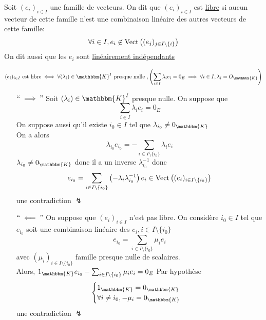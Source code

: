 \begin{defn}
	Soit $(e_i)_{i\in I}$ une famille de vecteurs. On dit que $(e_i)_{i\in I}$ est \underline{libre} si aucun vecteur de cette famille n'est une combinaison linéaire des autres vecteurs de cette famille: \[
		\forall i \in I, e_{i} \not\in \operatorname{Vect}\left( (e_j)_{j\in I \setminus \{i\}} \right) 
	\] On dit aussi que les  $e_i$ sont \underline{linéairement indépendants}
\end{defn}

\begin{prop}
	\[
		(e_i)_{i\in I} \text{ est libre} \iff
		\forall (\lambda_i) \in \mathbbm{K}^I \text{ presque nulle },
		\left( \sum_{i \in I} \lambda_i e_i = 0_E \implies \forall i \in I, \lambda_i = O_\mathbbm{K} \right) 
	\] 
\end{prop}

\begin{prv}
	\begin{itemize}
		\item[$``\implies"$] Soit $(\lambda_i) \in \mathbbm{K}^I$ presque nulle. On suppose que \[
				\sum_{i \in I} \lambda_i e_i = 0_E
			\] On suppose aussi qu'il existe $i_0 \in I$ tel que $\lambda_{i_0} \neq 0_\mathbbm{K}$\\
			On a alors \[
				\lambda_{i_0}e_{i_0} = -\sum_{i \in I \setminus \{i_0\}} \lambda_i e_i
			\]
			$\lambda_{i_0} \neq 0_\mathbbm{K}$ donc il a un inverse $\lambda^{-1}_{i_0}$ donc \[
				e_{i_0} = \sum_{i \in I\setminus \{i_0\}} \left(-\lambda_i\lambda^{-1}_{i_0}\right)
				e_i \in \operatorname{Vect}\left( (e_i)_{i\in I\setminus \{i_0\} } \right) 
			\] une contradiction $\lightning$
		\item[$``\impliedby"$] On suppose que $(e_i)_{i\in I}$ n'est pas libre. On considère $i_0 \in I$ tel que $e_{i_0}$ soit une combinaison linéaire des $e_i, i \in I \setminus \{i_0\}$
			\[
				e_{i_0} = \sum_{i \in I\setminus \{i_0\}} \mu_i e_i
			\] avec $(\mu_i)_{i\in I \setminus \{i_0\}}$ famille presque nulle de scalaires.\\
			Alors, $1_{\mathbbm{K}}e_{i_0} - \sum_{i \in I\setminus \{i_0\}} \mu_ie_i = 0_E$
			Par hypothèse \[
				\begin{cases}
					1_\mathbbm{K} = 0_\mathbbm{K}\\
					\forall i \neq i_0, -\mu_i = 0_\mathbbm{K}
				\end{cases}
			\] une contradiction $\lightning$
	\end{itemize}
\end{prv}

